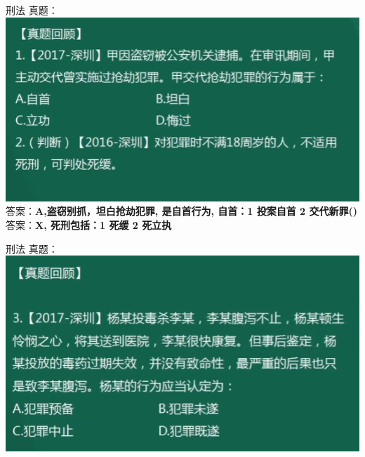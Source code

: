 \documentclass[aspectratio=169]{beamer}
\begin{document}
\begin{frame}[t]{刑法}
    真题：\\
    \includegraphics[scale=0.4]{criminal_law_001}\\ 
    答案：\textbf{A,盗窃别抓，坦白抢劫犯罪, 是自首行为, 自首：1 投案自首 2 交代新罪()}\\
    答案：\textbf{X, 死刑包括：1 死缓 2 死立执}\\
\end{frame}

\begin{frame}[t]{刑法}
    真题：\\
    \includegraphics[scale=0.4]{criminal_law_002}\\ 
\end{frame}
\end{document}
